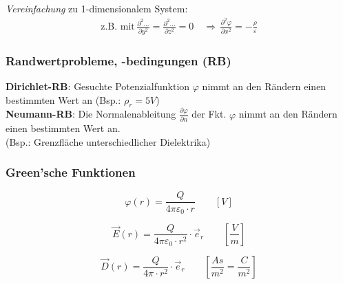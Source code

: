 \textit{Vereinfachung} zu 1-dimensionalem System:
\begin{align*}
	\text{z.B. mit}\, \frac{\partial^2...}{\partial y^2} = \frac{\partial^2...}{\partial z^2} = 0 \quad \Rightarrow \, \frac{\partial^2 \varphi}{\partial x^2} = -\frac{\rho}{\varepsilon}
\end{align*}

\subsubsection{Randwertprobleme, -bedingungen (RB)}
	\textbf{Dirichlet-RB}: Gesuchte Potenzialfunktion $ \varphi $ nimmt an den Rändern einen bestimmten Wert an (Bsp.: $\rho_r = 5V$) \\
	
	\textbf{Neumann-RB}: Die Normalenableitung $ \tfrac{\partial\varphi}{\partial n} $ der Fkt. $ \varphi $ nimmt an den Rändern einen bestimmten Wert an. \\ (Bsp.: Grenzfläche unterschiedlicher Dielektrika)

\subsubsection{Green'sche Funktionen}
\[ \varphi (r) = \dfrac{Q}{4 \pi \varepsilon_0 \cdot r} \qquad\left[V\right]\] 

\[ \vec{E}(r) = \dfrac{Q}{4 \pi \varepsilon_0 \cdot r^2}\cdot\vec{e}_r \qquad\left[\frac{V}{m}\right]\] 

\[ \vec{D}(r) = \dfrac{Q}{4 \pi \cdot r^2}\cdot\vec{e}_r \qquad\left[\frac{As}{m^2}=\frac{C}{m^2}\right]\]


